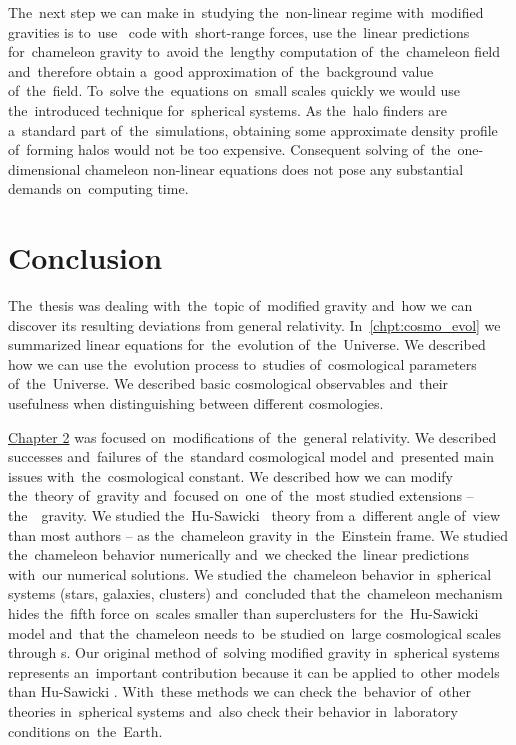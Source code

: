 The~next step we can make in~studying the~non-linear regime with~modified gravities is to~use \nbody\ code with~short-range forces, use the~linear predictions for~chameleon gravity to~avoid the~lengthy computation of~the~chameleon field and~therefore obtain a~good approximation of~the~background value of~the~field. To~solve the~equations on~small scales quickly we would use the~introduced technique for~spherical systems. As the~halo finders are a~standard part of~the~simulations, obtaining some approximate density profile of~forming halos would not be too expensive. Consequent solving of~the~one-dimensional chameleon non-linear equations does not pose any substantial demands on~computing time.\clearpage{}
\clearpage{}\chapter*{Conclusion}
The~thesis was dealing with~the~topic of~modified gravity and~how we can discover its resulting deviations from general relativity. In~\autoref{chpt:cosmo_evol} we summarized linear equations for~the~evolution of~the~Universe. We described how we can use the~evolution process to~studies of~cosmological parameters of~the~Universe. We described basic cosmological observables and~their usefulness when distinguishing between different cosmologies.

\hyperref[chpt:de_mg]{Chapter 2} was focused on~modifications of~the~general relativity. We described successes and~failures of~the~standard cosmological model and~presented main issues with~the~cosmological constant. We described how we can modify the~theory of~gravity and~focused on~one of~the~most studied extensions -- the~\fR\ gravity. We studied the~Hu-Sawicki \fR\ theory from a~different angle of~view than most authors -- as the~chameleon gravity in~the~Einstein frame. We studied the~chameleon behavior numerically and~we checked the~linear predictions with~our numerical solutions. We studied the~chameleon behavior in~spherical systems (stars, galaxies, clusters) and~concluded that the~chameleon mechanism hides the~fifth force on~scales smaller than superclusters for~the~Hu-Sawicki model and~that the~chameleon needs to~be studied on~large cosmological scales through \nbodysim s. Our original method of~solving modified gravity in~spherical systems represents an~important contribution because it can be applied to~other models than Hu-Sawicki \fR. With~these methods we can check the~behavior of~other theories in~spherical systems and~also check their behavior in~laboratory conditions on~the~Earth.

